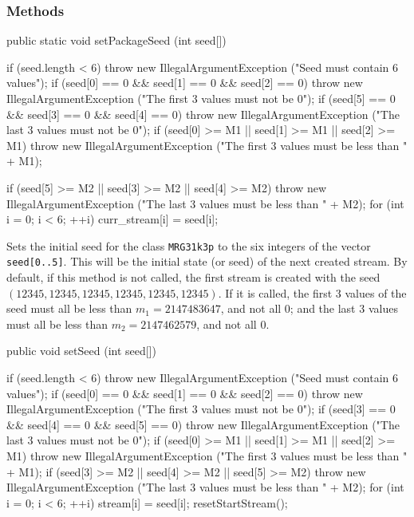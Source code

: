 \subsubsection* {Methods}
\begin{code}
   public static void setPackageSeed (int seed[]) \begin{hide} {
      if (seed.length < 6)
         throw new IllegalArgumentException ("Seed must contain 6 values");
      if (seed[0] == 0 && seed[1] == 0 && seed[2] == 0)
         throw new IllegalArgumentException ("The first 3 values must not be 0");
      if (seed[5] == 0 && seed[3] == 0 && seed[4] == 0)
         throw new IllegalArgumentException ("The last 3 values must not be 0");
      if (seed[0] >= M1 || seed[1] >= M1 || seed[2] >= M1)
         throw new IllegalArgumentException ("The first 3 values must be less than " + M1);

      if (seed[5] >= M2 || seed[3] >= M2 || seed[4] >= M2)
         throw new IllegalArgumentException ("The last 3 values must be less than " + M2);
      for (int i = 0; i < 6;  ++i)
         curr_stream[i] = seed[i];
   } \end{hide}
\end{code}
\begin{tabb} Sets the initial seed for the class \texttt{MRG31k3p} to the six
  integers of the vector \texttt{seed[0..5]}.
  This will be the initial state (or seed) of the next created stream.
  By default, if this method is not called, the first stream is created with
  the seed $(12345, 12345, 12345, 12345, 12345, 12345)$. If it is called,
  the first 3 values of the seed must all be less than $m_1 = 2147483647$,
  and not all 0; and the last 3 values must all be less than $m_2 =
  2147462579$, and not all 0.
\end{tabb}
\begin{htmlonly}
\end{htmlonly}
\begin{code}

   public void setSeed (int seed[]) \begin{hide} {
      if (seed.length < 6)
         throw new IllegalArgumentException ("Seed must contain 6 values");
      if (seed[0] == 0 && seed[1] == 0 && seed[2] == 0)
         throw new IllegalArgumentException ("The first 3 values must not be 0");
      if (seed[3] == 0 && seed[4] == 0 && seed[5] == 0)
         throw new IllegalArgumentException ("The last 3 values must not be 0");
      if (seed[0] >= M1 || seed[1] >= M1 || seed[2] >= M1)
         throw new IllegalArgumentException ("The first 3 values must be less than " + M1);
      if (seed[3] >= M2 || seed[4] >= M2 || seed[5] >= M2)
         throw new IllegalArgumentException ("The last 3 values must be less than " + M2);
      for (int i = 0; i < 6;  ++i)
         stream[i] = seed[i];
      resetStartStream();
   } \end{hide}
\end{code}
